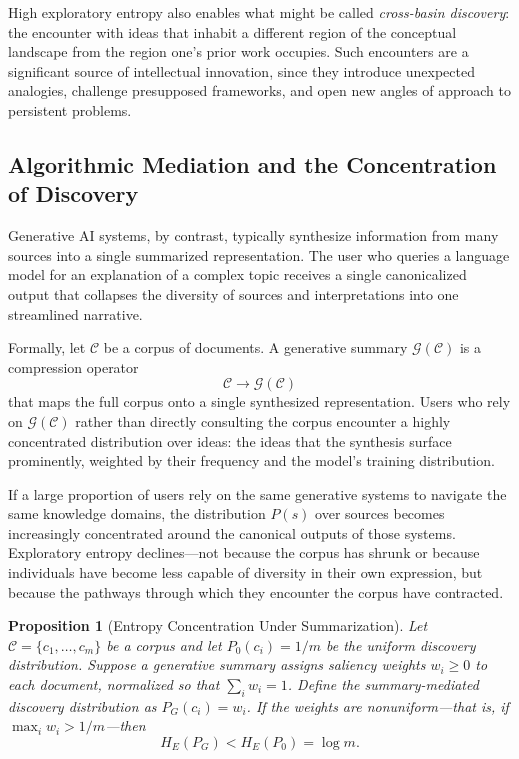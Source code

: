 \documentclass[12pt,a4paper]{article}
\theoremstyle{definition}
\theoremstyle{plain}
\newtheorem{proposition}[definition]{Proposition}
\theoremstyle{remark}
\newcommand{\HE}{H_{E}}
\newcommand{\calC}{\mathcal{C}}
\newcommand{\calG}{\mathcal{G}}
\begin{document}
High exploratory entropy also enables what might be called \emph{cross-basin discovery}: the
encounter with ideas that inhabit a different region of the conceptual landscape from the
region one's prior work occupies. Such encounters are a significant source of intellectual
innovation, since they introduce unexpected analogies, challenge presupposed frameworks, and
open new angles of approach to persistent problems.

\subsection{Algorithmic Mediation and the Concentration of Discovery}

Generative AI systems, by contrast, typically synthesize information from many sources into
a single summarized representation. The user who queries a language model for an explanation
of a complex topic receives a single canonicalized output that collapses the diversity of
sources and interpretations into one streamlined narrative.

Formally, let $\calC$ be a corpus of documents. A generative summary $\calG(\calC)$ is a
compression operator
\[
\calC \to \calG(\calC)
\]
that maps the full corpus onto a single synthesized representation. Users who rely on
$\calG(\calC)$ rather than directly consulting the corpus encounter a highly concentrated
distribution over ideas: the ideas that the synthesis surface prominently, weighted by their
frequency and the model's training distribution.

If a large proportion of users rely on the same generative systems to navigate the same
knowledge domains, the distribution $P(s)$ over sources becomes increasingly concentrated
around the canonical outputs of those systems. Exploratory entropy declines---not because
the corpus has shrunk or because individuals have become less capable of diversity in their
own expression, but because the pathways through which they encounter the corpus have
contracted.

\begin{proposition}[Entropy Concentration Under Summarization]
\label{prop:concentration}
Let $\calC = \{c_1, \ldots, c_m\}$ be a corpus and let $P_0(c_i) = 1/m$ be the uniform
discovery distribution. Suppose a generative summary assigns saliency weights
$w_i \geq 0$ to each document, normalized so that $\sum_i w_i = 1$. Define the
summary-mediated discovery distribution as $P_G(c_i) = w_i$. If the weights are
nonuniform---that is, if $\max_i w_i > 1/m$---then
\[
\HE(P_G) < \HE(P_0) = \log m.
\]
\end{proposition}
\end{document}
